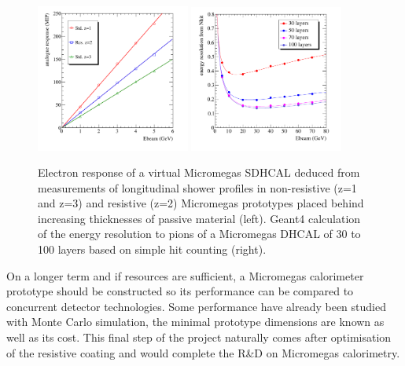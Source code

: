 \begin{figure}[hbp]
\begin{centering}
\includegraphics[width=0.45\textwidth]{Calorimeter/SDHCal/splam_linearity}
\includegraphics[width=0.45\textwidth]{Calorimeter/SDHCal/g4reso_sdhcal}
\caption{Electron response of a virtual Micromegas SDHCAL deduced from measurements of longitudinal shower profiles in non-resistive (z=1 and z=3) and resistive (z=2) Micromegas prototypes placed behind increasing thicknesses of passive material (left). Geant4 calculation of the energy resolution to pions of a Micromegas DHCAL of 30 to 100 layers based on simple hit counting (right).}
\label{future}
\end{centering}
\end{figure}

On a longer term and if resources are sufficient, a Micromegas calorimeter prototype should be constructed so its performance can be compared to concurrent detector technologies. Some performance have already been studied with Monte Carlo simulation, the minimal prototype dimensions are known as well as its cost. This final step of the project naturally comes after optimisation of the resistive coating and would complete the R\&D on Micromegas calorimetry.
